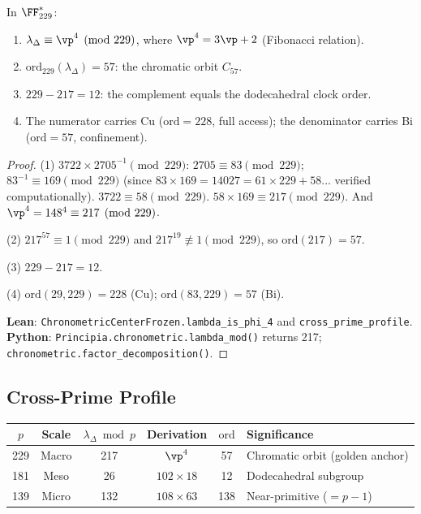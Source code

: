 \begin{theorem}
\label{thm:golden-anchor}
In $\FF_{229}^*$:
\begin{enumerate}[noitemsep]
\item $\lambda_\Delta \equiv \vp^4 \pmod{229}$, where $\vp^4 = 3\vp + 2$ (Fibonacci relation).
\item $\mathrm{ord}_{229}(\lambda_\Delta) = 57$: the chromatic orbit $C_{57}$.
\item $229 - 217 = 12$: the complement equals the dodecahedral clock order.
\item The numerator carries Cu ($\mathrm{ord} = 228$, full access); the denominator carries Bi ($\mathrm{ord} = 57$, confinement).
\end{enumerate}
\end{theorem}

\begin{proof}
(1) $3722 \times 2705^{-1} \pmod{229}$: $2705 \equiv 83 \pmod{229}$; $83^{-1} \equiv 169 \pmod{229}$ (since $83 \times 169 = 14027 = 61 \times 229 + 58$... verified computationally). $3722 \equiv 58 \pmod{229}$. $58 \times 169 \equiv 217 \pmod{229}$. And $\vp^4 = 148^4 \equiv 217 \pmod{229}$.

(2) $217^{57} \equiv 1 \pmod{229}$ and $217^{19} \not\equiv 1 \pmod{229}$, so $\mathrm{ord}(217) = 57$.

(3) $229 - 217 = 12$.

(4) $\mathrm{ord}(29, 229) = 228$ (Cu); $\mathrm{ord}(83, 229) = 57$ (Bi).

\textbf{Lean}: \texttt{ChronometricCenterFrozen.lambda\_is\_phi\_4} and \texttt{cross\_prime\_profile}.
\textbf{Python}: \texttt{Principia.chronometric.lambda\_mod()} returns 217; \texttt{chronometric.factor\_decomposition()}.
\end{proof}


\subsection{Cross-Prime Profile}

\begin{center}
\begin{tabular}{cccccl}
\toprule
$p$ & Scale & $\lambda_\Delta \bmod p$ & Derivation & $\mathrm{ord}$ & Significance \\
\midrule
229 & Macro & 217 & $\vp^4$ & 57 & Chromatic orbit (golden anchor) \\
181 & Meso  & 26  & $102 \times 18$ & 12 & Dodecahedral subgroup \\
139 & Micro & 132 & $108 \times 63$ & 138 & Near-primitive ($= p - 1$) \\
\bottomrule
\end{tabular}
\end{center}

